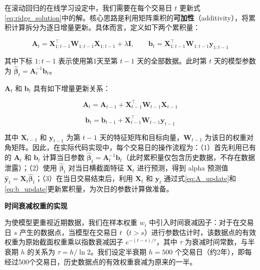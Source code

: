 \documentclass{article}
\begin{document}
在滚动回归的在线学习设定中，我们需要在每个交易日 $t$ 更新式\ref{eq:ridge_solution}中的解。核心思路是利用矩阵乘积的\textbf{可加性}（additivity），将累积计算拆分为逐日增量更新。具体而言，定义如下两个累积量：

\begin{equation}
    \mathbf{A}_t = \mathbf{X}_{1:t-1}^{\top} \mathbf{W}_{1:t-1} \mathbf{X}_{1:t-1} + \lambda \mathbf{I}, \qquad
    \mathbf{b}_t = \mathbf{X}_{1:t-1}^{\top} \mathbf{W}_{1:t-1} \mathbf{y}_{1:t-1}
    \label{eq:cumulative}
\end{equation}

\noindent 其中下标 $1:t-1$ 表示使用第1天至第 $t-1$ 天的全部数据。此时第 $t$ 天的模型参数为 $\hat{\boldsymbol{\beta}}_t = \mathbf{A}_t^{-1} \mathbf{b}_t$。

$\mathbf{A}_t$ 和 $\mathbf{b}_t$ 具有如下增量更新关系：

\begin{equation}
    \mathbf{A}_t = \mathbf{A}_{t-1} + \mathbf{X}_{t-1}^{\top} \mathbf{W}_{t-1} \mathbf{X}_{t-1}
    \label{eq:A_update}
\end{equation}

\begin{equation}
    \mathbf{b}_t = \mathbf{b}_{t-1} + \mathbf{X}_{t-1}^{\top} \mathbf{W}_{t-1} \mathbf{y}_{t-1}
    \label{eq:b_update}
\end{equation}

\noindent 其中 $\mathbf{X}_{t-1}$ 和 $\mathbf{y}_{t-1}$ 为第 $t-1$ 天的特征矩阵和目标向量，$\mathbf{W}_{t-1}$ 为该日的权重对角矩阵。因此，在实际代码实现中，每个交易日的操作流程为：（1）首先利用已有的 $\mathbf{A}_t$ 和 $\mathbf{b}_t$ 计算当日参数 $\hat{\boldsymbol{\beta}}_t = \mathbf{A}_t^{-1} \mathbf{b}_t$（此时累积量仅包含历史数据，不存在数据泄露）；（2）使用 $\hat{\boldsymbol{\beta}}_t$ 对当日横截面特征 $\mathbf{X}_t$ 进行预测，得到 alpha 预测值 $\hat{\mathbf{y}}_t = \mathbf{X}_t \hat{\boldsymbol{\beta}}_t$；（3）在当日交易结束后，利用 $\mathbf{X}_t$ 和 $\mathbf{y}_t$ 通过式\ref{eq:A_update}和\ref{eq:b_update}更新累积量，为次日的参数计算做准备。

\vspace{0.5em}
\noindent\textbf{时间衰减权重的实现}

为使模型更重视近期数据，我们在样本权重 $w_i$ 中引入时间衰减因子：对于在交易日 $s$ 产生的数据点，当模型在交易日 $t$（$t > s$）进行参数估计时，该数据点的有效权重为原始截面权重乘以指数衰减因子 $e^{-(t-s)/\tau}$，其中 $\tau$ 为衰减时间常数，与半衰期 $h$ 的关系为 $\tau = h / \ln 2$。我们设定半衰期 $h = 500$ 个交易日（约2年），即每经过500个交易日，历史数据点的有效权重衰减为原来的一半。
\end{document}
